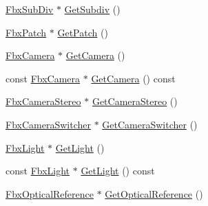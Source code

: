 \begin{Indent}
\begin{DoxyCompactItemize}
\item 
\hyperlink{class_fbx_sub_div}{Fbx\+Sub\+Div} $\ast$ \hyperlink{class_fbx_node_aaa4046b59bfd467d72e607a56b2d41c1}{Get\+Subdiv} ()
\item 
\hyperlink{class_fbx_patch}{Fbx\+Patch} $\ast$ \hyperlink{class_fbx_node_aa45a5513f61ef270d55c31c8f700309f}{Get\+Patch} ()
\item 
\hyperlink{class_fbx_camera}{Fbx\+Camera} $\ast$ \hyperlink{class_fbx_node_aac6f56442ef532b516c7d404e1528366}{Get\+Camera} ()
\item 
const \hyperlink{class_fbx_camera}{Fbx\+Camera} $\ast$ \hyperlink{class_fbx_node_a8c852806c2a5381eb435639efc30518d}{Get\+Camera} () const
\item 
\hyperlink{class_fbx_camera_stereo}{Fbx\+Camera\+Stereo} $\ast$ \hyperlink{class_fbx_node_abcf4721e24b4bad01932342ff62778b5}{Get\+Camera\+Stereo} ()
\item 
\hyperlink{class_fbx_camera_switcher}{Fbx\+Camera\+Switcher} $\ast$ \hyperlink{class_fbx_node_a24f4e1fcaba56ddb71276a787c7cbb6f}{Get\+Camera\+Switcher} ()
\item 
\hyperlink{class_fbx_light}{Fbx\+Light} $\ast$ \hyperlink{class_fbx_node_ae0a001060ab0ae9dc7ce0e9be6781e96}{Get\+Light} ()
\item 
const \hyperlink{class_fbx_light}{Fbx\+Light} $\ast$ \hyperlink{class_fbx_node_a8ad557a5504778a16b2fca84797b7fea}{Get\+Light} () const
\item 
\hyperlink{class_fbx_optical_reference}{Fbx\+Optical\+Reference} $\ast$ \hyperlink{class_fbx_node_ac57938bd3c161cdaf7be7f786cbe1eeb}{Get\+Optical\+Reference} ()
\end{DoxyCompactItemize}
\end{Indent}
